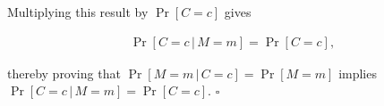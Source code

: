 \documentclass[../midterm.tex]{subfiles}
\begin{document}
\begin{flushleft}
Multiplying this result by $\Pr \left[ C = c \right]$ gives

\begin{align}
\Pr \left[ C = c \, \vert \, M = m \right] = \Pr \left[ C = c \right],
\end{align}

thereby proving that $\Pr \left[ M = m \, \vert \, C = c \right] = \Pr \left[ M = m \right]$ implies $\Pr \left[ C = c \, \vert \, M = m \right] = \Pr \left[ C = c \right]$. \newline
$\square$ \newline

\end{flushleft}
\end{document}

